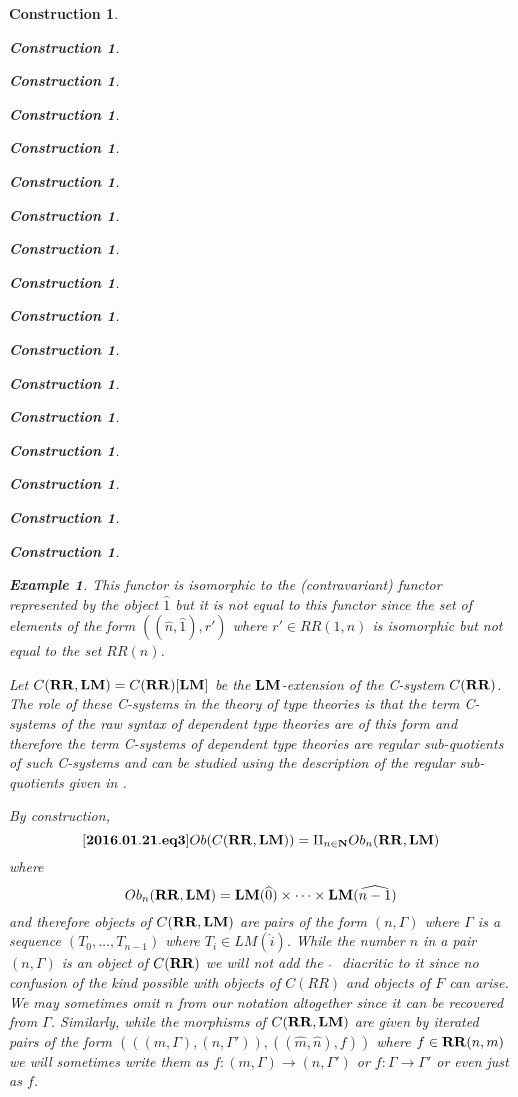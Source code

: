 \documentclass[12pt]{amsart}
\newenvironment{eq}{\begin{equation}}{\end{equation}}
\newtheorem{example}[proposition]{Example}
\newtheorem{construction}[proposition]{Construction}
\newcommand{\llabel}[1]{\label{#1}[{\bf #1}]}
\newcommand{\sr}{\rightarrow}
\newcommand{\nn}{{\bf N\rm}}
\newcommand{\nat}{\nn}
\newcommand{\wh}{\widehat}
\newcommand{\RR}{{\bf RR}}
\newcommand{\LM}{{\bf LM}}
\begin{document}
\begin{construction}
\begin{construction}
\begin{construction}
\begin{construction}
\begin{construction}
\begin{construction}
\begin{construction}
\begin{construction}
\begin{construction}
\begin{construction}
\begin{construction}
\begin{construction}
\begin{construction}
\begin{construction}
\begin{construction}
\begin{construction}
\begin{construction}
\begin{example}
This functor is isomorphic to the (contravariant) functor represented by the object $\wh{1}$ but it is not equal to this functor since the set of elements of the form  $((\wh{n},\wh{1}),r')$ where $r'\in RR(1,n)$ is isomorphic but not equal to the set $RR(n)$.
\end{example}

Let $C(\RR,\LM)=C(\RR)[\LM]$ be the $\LM$-extension of the C-system $C(\RR)$. The role of these C-systems in the theory of type theories is that the term C-systems of the raw syntax of dependent type theories are of this form and therefore the term C-systems of dependent type theories are regular sub-quotients of such C-systems and can be studied using the description of the regular sub-quotients given in \cite{Csubsystems}.  

By construction,
%
\begin{eq}\llabel{2016.01.21.eq3}
Ob(C(\RR,\LM))=\amalg_{n\in\nat}Ob_n(\RR,\LM)
\end{eq}
%
where 
%
$$Ob_n(\RR,\LM)=\LM(\wh{0})\times\dots\times\LM(\wh{n-1})$$
%
and therefore objects of $C(\RR,\LM)$ are pairs of the form $(n,\Gamma)$ where $\Gamma$ is a sequence $(T_0,\dots,T_{n-1})$ where $T_i\in LM(\wh{i})$. While the number $n$ in a pair $(n,\Gamma)$ is an object of $C(\RR)$ we will not add the ${\,\,\wh{}\,\,}$ diacritic to it since no confusion of the kind possible with objects of $C(RR)$ and objects of $F$ can arise. We may sometimes omit $n$ from our notation altogether since it can be recovered from $\Gamma$. Similarly, while the morphisms of $C(\RR,\LM)$ are given by iterated pairs of the form $(((m,\Gamma),(n,\Gamma')),((\wh{m},\wh{n}),f))$ where $f\in \RR(n,m)$ we will sometimes write them as $f:(m,\Gamma)\sr (n,\Gamma')$ or $f:\Gamma\sr \Gamma'$ or even just as $f$. 


\end{construction}
\end{construction}
\end{construction}
\end{construction}
\end{construction}
\end{construction}
\end{construction}
\end{construction}
\end{construction}
\end{construction}
\end{construction}
\end{construction}
\end{construction}
\end{construction}
\end{construction}
\end{construction}
\end{construction}
\end{document}
